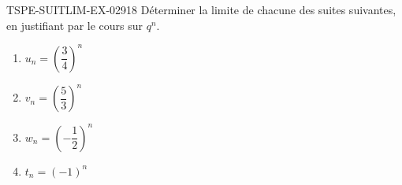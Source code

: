 \begin{exercice}{TSPE-SUITLIM-EX-029}{1}{8}
Déterminer la limite de chacune des suites suivantes, en justifiant par le cours sur $q^n$.
\begin{enumerate}
  \item $u_n = \left(\dfrac{3}{4}\right)^n$
  \item $v_n = \left(\dfrac{5}{3}\right)^n$
  \item $w_n = \left(-\dfrac{1}{2}\right)^n$
  \item $t_n = (-1)^n$
\end{enumerate}
\end{exercice}
